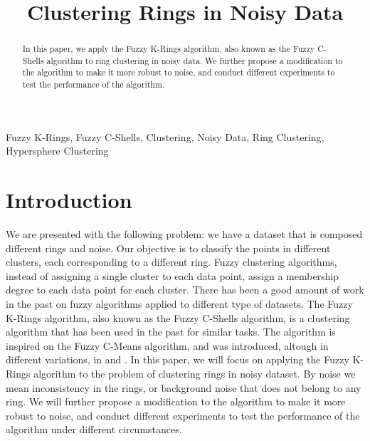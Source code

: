 \documentclass[conference]{IEEEtran}
\begin{document}
\title{Clustering Rings in Noisy Data}

\author{

}
\maketitle

\begin{abstract}
In this paper, we apply the Fuzzy K-Rings algorithm, also known as the Fuzzy C-Shells algorithm to ring clustering in noisy data.
We further propose a modification to the algorithm to make it more robust to noise, and conduct different experiments to test the performance of the algorithm.
\end{abstract}

\begin{IEEEkeywords}
Fuzzy K-Rings, Fuzzy C-Shells, Clustering, Noisy Data, Ring Clustering, Hypersphere Clustering
\end{IEEEkeywords}

\section{Introduction}
We are presented with the following problem: we have a dataset that is composed different rings and noise. Our objective is to classify the points in different clusters,
each corresponding to a different ring. Fuzzy clustering algorithms, instead of assigning a single cluster to each data point, assign a membership degree to each data point for each cluster. There has been a good
amount of work in the past on fuzzy algorithms applied to different type of datasets. The Fuzzy K-Rings algorithm, also known as the Fuzzy C-Shells algorithm, is a clustering algorithm that has been used in the past
for similar tasks. The algorithm is inspired on the Fuzzy C-Means algorithm, and was introduced, altough in different variations, in \cite{308484} and \cite{DAVE1992713}. In this paper,
we will focus on applying the Fuzzy K-Rings algorithm to the problem of clustering rings in noisy dataset. By noise we mean inconsistency in the rings, or background noise that does not belong to any ring.
We will further propose a modification to the algorithm to make it more robust to noise, and conduct different experiments to test the performance of the algorithm under different circumstances.
\end{document}
